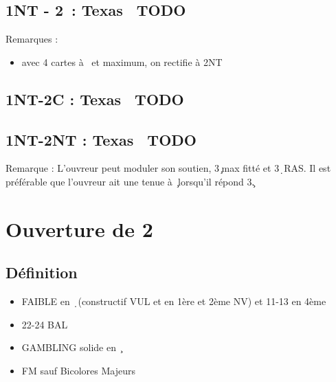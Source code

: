 \documentclass[a4paper]{article}
\begin{document}
\subsection{1NT - 2\pdfh\ : Texas \pdfs\ TODO}

Remarques :

\begin{itemize}
\item avec 4 cartes à \s\ et maximum, on rectifie à 2NT

\end{itemize}

\subsection{1NT-2C : Texas \pdfc\ TODO}

\subsection{1NT-2NT : Texas \pdfd\ TODO}

Remarque : L'ouvreur peut moduler son soutien, 3\c\ max fitté et 3\d\ RAS.
Il est préférable que l'ouvreur ait une tenue à \c\ lorsqu'il répond 3\c .

\section{Ouverture de 2\pdfc}

\subsection{Définition}

\begin{itemize}
\item FAIBLE en \d\ (constructif VUL et en 1ère et 2ème NV) et 11-13 en 4ème

\item 22-24 BAL

\item GAMBLING solide en \c\ 

\item FM sauf Bicolores Majeurs

\end{itemize}
\end{document}
